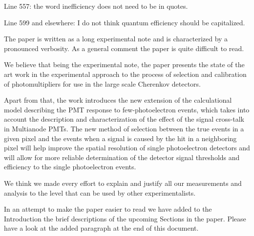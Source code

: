 \documentclass[11pt]{report}
\begin{document}
\begin{tcolorbox}[enlarge top by=2em,colbacktitle=black!60!white,colframe=black!80!white,left=0pt,right=0pt,top=0pt,bottom=0pt,boxrule=0.3pt,title=\bfseries1.13 and 1.14]
Line 557:  the word inefficiency does not need to be in quotes.

Line 599 and elsewhere:  I do not think quantum efficiency should be capitalized.
\end{tcolorbox}








\clearpage






\begin{tcolorbox}[enlarge top by=2em,colbacktitle=black!60!white,colframe=black!80!white,left=0pt,right=0pt,top=0pt,bottom=0pt,boxrule=0.3pt,title=\bfseries2.01]
The paper is written as a long experimental note and is characterized by a pronounced verbosity. As a general comment the paper is quite difficult to read.
\end{tcolorbox}

We believe that being the experimental note, the paper presents the state of the art work in the experimental approach to the process of selection and calibration of photomultipliers for use in the large scale Cherenkov detectors. 

Apart from that, the work introduces the new extension of the calculational model describing the PMT response to few-photoelectron events, which takes into account the description and characterization of the effect of the signal cross-talk in Multianode PMTs.
The new method of selection between the true events in a given pixel and the events when a signal is caused by the hit in a neighboring pixel will help improve the spatial resolution of single photoelectron detectors and will allow for more reliable determination of the detector signal thresholds and efficiency to the single photoelectron events.

We think we made every effort to explain and justify all our measurements and analysis to the level that can be used by other experimentalists.

In an attempt to make the paper easier to read we have added to the Introduction the brief descriptions of the upcoming Sections in the paper. Please have a look at the added paragraph at the end of this document. 
\end{document}
